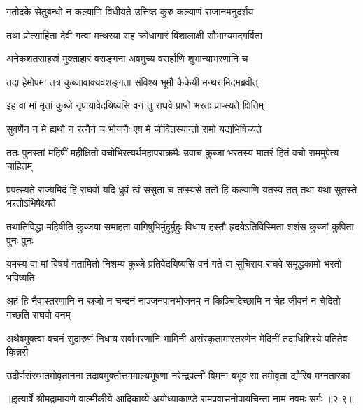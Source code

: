 \twolineshloka
{गतोदके सेतुबन्धो न कल्याणि विधीयते}
{उत्तिष्ठ कुरु कल्याणं राजानमनुदर्शय} %

\twolineshloka
{तथा प्रोत्साहिता देवी गत्वा मन्थरया सह}
{क्रोधागारं विशालाक्षी सौभाग्यमदगर्विता} %

\twolineshloka
{अनेकशतसाहस्रं मुक्ताहारं वराङ्गना}
{अवमुच्य वरार्हाणि शुभान्याभरणानि च} %

\twolineshloka
{तदा हेमोपमा तत्र कुब्जावाक्यवशङ्गता}
{संविश्य भूमौ कैकेयी मन्थरामिदमब्रवीत्} %

\twolineshloka
{इह वा मां मृतां कुब्जे नृपायावेदयिष्यसि}
{वनं तु राघवे प्राप्ते भरतः प्राप्स्यते क्षितिम्} %

\twolineshloka
{सुवर्णेन न मे ह्यर्थो न रत्नैर्न च भोजनैः}
{एष मे जीवितस्यान्तो रामो यद्यभिषिच्यते} %

\twolineshloka
{ततः पुनस्तां महिषीं महीक्षितो वचोभिरत्यर्थमहापराक्रमैः}
{उवाच कुब्जा भरतस्य मातरं हितं वचो राममुपेत्य चाहितम्} %

\twolineshloka
{प्रपत्स्यते राज्यमिदं हि राघवो यदि ध्रुवं त्वं ससुता च तप्स्यसे}
{ततो हि कल्याणि यतस्व तत् तथा यथा सुतस्ते भरतोऽभिषेक्ष्यते} %

\twolineshloka
{तथातिविद्धा महिषीति कुब्जया समाहता वागिषुभिर्मुहुर्मुहुः}
{विधाय हस्तौ हृदयेऽतिविस्मिता शशंस कुब्जां कुपिता पुनः पुनः} %

\twolineshloka
{यमस्य वा मां विषयं गतामितो निशम्य कुब्जे प्रतिवेदयिष्यसि}
{वनं गते वा सुचिराय राघवे समृद्धकामो भरतो भविष्यति} %

\twolineshloka
{अहं हि नैवास्तरणानि न स्रजो न चन्दनं नाञ्जनपानभोजनम्}
{न किञ्चिदिच्छामि न चेह जीवनं न चेदितो गच्छति राघवो वनम्} %

\twolineshloka
{अथैवमुक्त्वा वचनं सुदारुणं निधाय सर्वाभरणानि भामिनी}
{असंस्कृतामास्तरणेन मेदिनीं तदाधिशिश्ये पतितेव किन्नरी} %

\twolineshloka
{उदीर्णसंरम्भतमोवृतानना तदावमुक्तोत्तममाल्यभूषणा}
{नरेन्द्रपत्नी विमना बभूव सा तमोवृता द्यौरिव मग्नतारका} %


॥इत्यार्षे श्रीमद्रामायणे वाल्मीकीये आदिकाव्ये अयोध्याकाण्डे रामप्रवासनोपायचिन्ता नाम नवमः सर्गः ॥२-९॥
